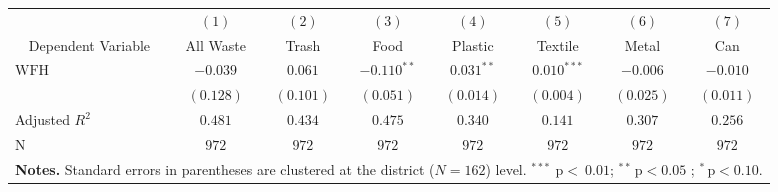 \centering
\small %
\setlength{\tabcolsep}{4pt} %
\begin{tabular}{l *{7}{c}}
\toprule
& $(1)$ & $(2)$ & $(3)$ & $(4)$ & $(5)$ & $(6)$ & $(7)$ \\
\multicolumn{1}{c}{Dependent Variable} & All Waste & Trash & Food & Plastic & Textile & Metal & Can \\
\midrule
$\mathrm{WFH}$ & $-0.039$ & $0.061$ & $-0.110^{**}$ & $0.031^{**}$ & $0.010^{***}$ & $-0.006$ & $-0.010$\\
& $(0.128)$ & $(0.101)$ & $(0.051)$ & $(0.014)$ & $(0.004)$ & $(0.025)$ & $(0.011)$\vspace{1mm} \\
Adjusted $R^2$ & $0.481$ & $0.434$ & $0.475$ & $0.340$ & $0.141$ & $0.307$ & $0.256$\\
$\mathrm{N}$ & $972$ & $972$ & $972$ & $972$ & $972$ & $972$ & $972$\\
\bottomrule
\multicolumn{8}{p{.9\textwidth}}{\small \textbf{Notes.} Standard errors in parentheses are clustered at the district ($N=162$) level. $^{***}~\, \mathrm{p}<~0.01$; $^{**}\, \mathrm{p}< 0.05$ ; $^{*} \, \mathrm{p}<0.10$.}
\end{tabular}